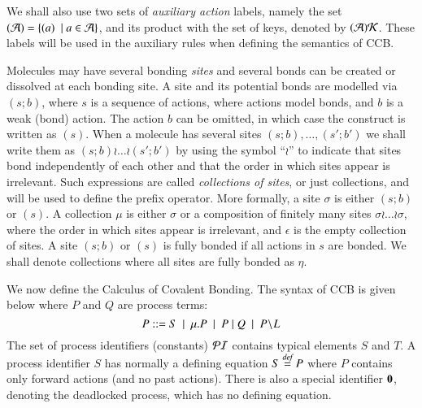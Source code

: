 We shall also use two sets of \emph{auxiliary action} labels, namely the set $(\mathcal{A}) =\{ (a)\ \mid a\in\mathcal{A}\}$, and its product with the set of keys, denoted by $(\mathcal{A})\mathcal{K}$. These labels will be used in the auxiliary rules when defining
the semantics of CCB.

Molecules may have several bonding \emph{sites} and several bonds can be created or dissolved at each bonding site. A site and its potential bonds are modelled via $(s;b)$, where $s$ is a sequence of actions, where actions model bonds, and $b$ is a weak (bond) action. The action $b$ can be omitted, in which case the construct is written as $(s)$. When a molecule has several sites 
$(s;b), \ldots,(s';b')$ we shall write them as $(s;b) \wr  \ldots \wr (s';b')$ by using the symbol ``$\wr$'' to indicate that sites bond independently of each other and that the order in which sites appear is irrelevant. Such expressions are called \emph{collections of sites}, or just collections, and will be used to define the prefix operator. More formally, a site $\sigma$
is either $(s;b)$ or $(s)$. A collection $\mu$ is either 
$\sigma$ or a composition of finitely many sites $\sigma\wr\ldots\wr \sigma$, where the order in which sites appear is irrelevant,
and $\epsilon$ is the empty collection of sites. 
A site $(s;b)$ or $(s)$ is fully bonded if all actions in $s$ are bonded. 
We shall denote collections where all sites are fully bonded as $\eta$.

We now define the Calculus of Covalent Bonding. The syntax of CCB is given 
below where $P$ and $Q$ are process terms:
$$P ::=  S \ \mid \ \mu.P \ \mid \ P\; \vert \; Q \ \mid \ P\!\setminus\!L $$
%
The set of process identifiers (constants) $\mathcal{PI}$ contains typical elements $S$ and $T$. 
A process identifier $S$ has normally a defining equation $S\stackrel{\emph{def}}{=} P$ where $P$ contains only forward 
actions (and no past actions). There is also a special identifier
 $\mathbf{0}$, denoting the deadlocked process, which has no defining equation.

